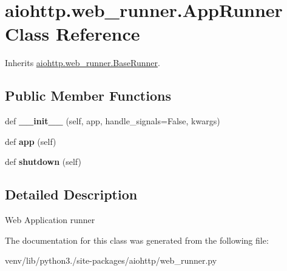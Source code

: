 \hypertarget{classaiohttp_1_1web__runner_1_1_app_runner}{}\section{aiohttp.\+web\+\_\+runner.\+App\+Runner Class Reference}
\label{classaiohttp_1_1web__runner_1_1_app_runner}


Inherits \hyperlink{classaiohttp_1_1web__runner_1_1_base_runner}{aiohttp.\+web\+\_\+runner.\+Base\+Runner}.

\subsection*{Public Member Functions}
\begin{DoxyCompactItemize}
\item 
\mbox{\label{classaiohttp_1_1web__runner_1_1_app_runner_a47c998f2d571ff2332021410bc0a43f5}} 
def {\bfseries \+\_\+\+\_\+init\+\_\+\+\_\+} (self, app, handle\+\_\+signals=False, kwargs)
\item 
\mbox{\label{classaiohttp_1_1web__runner_1_1_app_runner_ad1ba4dd80439ce1823b414c5ef1bd5d5}} 
def {\bfseries app} (self)
\item 
\mbox{\label{classaiohttp_1_1web__runner_1_1_app_runner_aff8548031701e30d66e254f12876dcb7}} 
def {\bfseries shutdown} (self)
\end{DoxyCompactItemize}


\subsection{Detailed Description}
\begin{DoxyVerb}Web Application runner\end{DoxyVerb}
 

The documentation for this class was generated from the following file\+:\begin{DoxyCompactItemize}
\item 
venv/lib/python3./site-\/packages/aiohttp/web\+\_\+runner.\+py\end{DoxyCompactItemize}
